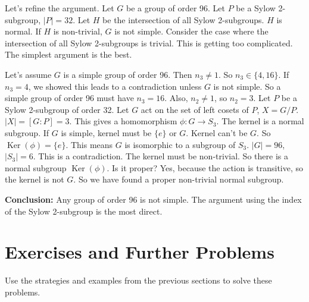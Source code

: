 \documentclass[12pt,a4paper]{article}
\theoremstyle{plain} %
\theoremstyle{definition} %
\theoremstyle{remark} %
\DeclareMathOperator{\Ker}{Ker}
\begin{document}
Let's refine the argument. Let $G$ be a group of order 96. Let $P$ be a Sylow 2-subgroup, $|P|=32$. Let $H$ be the intersection of all Sylow 2-subgroups. $H$ is normal. If $H$ is non-trivial, $G$ is not simple.
Consider the case where the intersection of all Sylow 2-subgroups is trivial.
This is getting too complicated. The simplest argument is the best.

Let's assume $G$ is a simple group of order 96.
Then $n_3 \neq 1$. So $n_3 \in \{4, 16\}$.
If $n_3=4$, we showed this leads to a contradiction unless $G$ is not simple. So a simple group of order 96 must have $n_3=16$.
Also, $n_2 \neq 1$, so $n_2=3$.
Let $P$ be a Sylow 2-subgroup of order 32.
Let $G$ act on the set of left cosets of $P$, $X = G/P$. $|X|=[G:P]=3$.
This gives a homomorphism $\phi: G \to S_3$.
The kernel is a normal subgroup. If $G$ is simple, kernel must be $\{e\}$ or $G$.
Kernel can't be $G$. So $\Ker(\phi)=\{e\}$.
This means $G$ is isomorphic to a subgroup of $S_3$.
$|G|=96$, $|S_3|=6$. This is a contradiction.
The kernel must be non-trivial.
So there is a normal subgroup $\Ker(\phi)$. Is it proper? Yes, because the action is transitive, so the kernel is not $G$.
So we have found a proper non-trivial normal subgroup.

\textbf{Conclusion:} Any group of order 96 is not simple. The argument using the index of the Sylow 2-subgroup is the most direct.

\newpage
\section{Exercises and Further Problems}

Use the strategies and examples from the previous sections to solve these problems.
\end{document}
